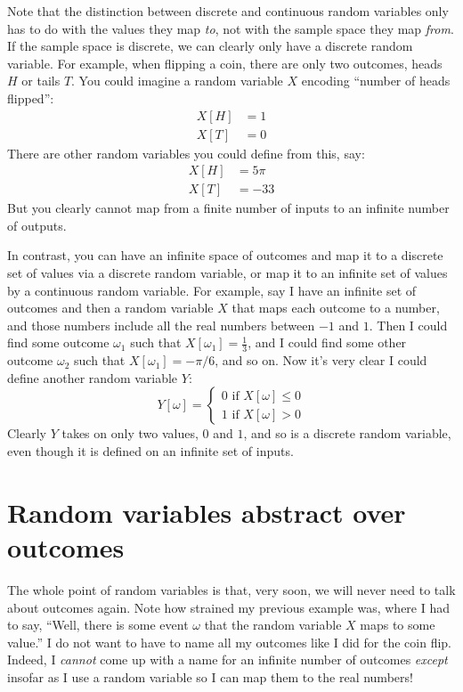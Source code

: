 Note that the distinction between discrete and continuous random variables only
has to do with the values they map \emph{to}, not with the sample space they
map \emph{from}. If the sample space is discrete, we can clearly only have a
discrete random variable. For example, when flipping a coin, there are only two
outcomes, heads $H$ or tails $T$. You could imagine a random variable $X$
encoding ``number of heads flipped'':
\begin{align*}
X[H] &= 1 \\
X[T] &= 0
\end{align*}
There are other random variables you could define from this, say:
\begin{align*}
X[H] &= 5\pi \\
X[T] &= -33
\end{align*}
But you clearly cannot map from a finite number of inputs to an infinite number
of outputs.

In contrast, you can have an infinite space of outcomes and map it to a
discrete set of values via a discrete random variable, or map it to an infinite
set of values by a continuous random variable. For example, say I have an
infinite set of outcomes and then a random variable $X$ that maps each outcome
to a number, and those numbers include all the real numbers between $-1$ and
$1$. Then I could find some outcome $\omega_1$ such that $X[\omega_1] =
\tfrac{1}{3}$, and I could find some other outcome $\omega_2$ such that
$X[\omega_1] = -\pi/6$, and so on. Now it's very clear I could define another
random variable $Y$:
\begin{equation*}
Y[\omega] = \begin{cases}
  0 \text{ if } X[\omega] \leq 0 \\
  1 \text{ if } X[\omega] > 0
\end{cases}
\end{equation*}
Clearly $Y$ takes on only two values, $0$ and $1$, and so is a discrete random
variable, even though it is defined on an infinite set of inputs.


\section{Random variables abstract over outcomes}

The whole point of random variables is that, very soon, we will never need to
talk about outcomes again. Note how strained my previous example was, where I
had to say, ``Well, there is some event $\omega$ that the random variable $X$
maps to some value.'' I do not want to have to name all my outcomes like I did
for the coin flip. Indeed, I \emph{cannot} come up with a name for an infinite
number of outcomes \emph{except} insofar as I use a random variable so I can
map them to the real numbers!

